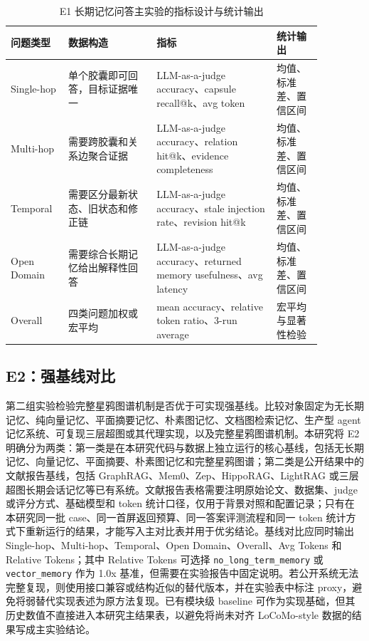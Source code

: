 \documentclass[a4paper,fleqn]{cas-sc}
\begin{document}
\begin{CJK*}{UTF8}{gbsn}
\begin{table}[t]
\centering
\scriptsize
\caption{E1 长期记忆问答主实验的指标设计与统计输出}
\label{tab:e1-main-qa}
\setlength{\tabcolsep}{3pt}
\begin{tabular}{P{0.15\linewidth}P{0.25\linewidth}P{0.34\linewidth}P{0.13\linewidth}}
\toprule
问题类型 & 数据构造 & 指标 & 统计输出 \\
\midrule
Single-hop & 单个胶囊即可回答，目标证据唯一 & LLM-as-a-judge accuracy、capsule recall@k、avg token & 均值、标准差、置信区间 \\
Multi-hop & 需要跨胶囊和关系边聚合证据 & LLM-as-a-judge accuracy、relation hit@k、evidence completeness & 均值、标准差、置信区间 \\
Temporal & 需要区分最新状态、旧状态和修正链 & LLM-as-a-judge accuracy、stale injection rate、revision hit@k & 均值、标准差、置信区间 \\
Open Domain & 需要综合长期记忆给出解释性回答 & LLM-as-a-judge accuracy、returned memory usefulness、avg latency & 均值、标准差、置信区间 \\
Overall & 四类问题加权或宏平均 & mean accuracy、relative token ratio、3-run average & 宏平均与显著性检验 \\
\bottomrule
\end{tabular}
\end{table}

\subsection{E2：强基线对比}

第二组实验检验完整星鸦图谱机制是否优于可实现强基线。比较对象固定为无长期记忆、纯向量记忆、平面摘要记忆、朴素图记忆、文档图检索记忆、生产型 agent 记忆系统、可复现三层超图或其代理实现，以及完整星鸦图谱机制。本研究将 E2 明确分为两类：第一类是在本研究代码与数据上独立运行的核心基线，包括无长期记忆、向量记忆、平面摘要、朴素图记忆和完整星鸦图谱；第二类是公开结果中的文献报告基线，包括 GraphRAG、Mem0、Zep、HippoRAG、LightRAG 或三层超图长期会话记忆等已有系统。文献报告表格需要注明原始论文、数据集、judge 或评分方式、基础模型和 token 统计口径，仅用于背景对照和配置记录；只有在本研究同一批 case、同一首屏返回预算、同一答案评测流程和同一 token 统计方式下重新运行的结果，才能写入主对比表并用于优劣结论。基线对比应同时输出 Single-hop、Multi-hop、Temporal、Open Domain、Overall、Avg Tokens 和 Relative Tokens；其中 Relative Tokens 可选择 \texttt{no\_long\_term\_memory} 或 \texttt{vector\_memory} 作为 1.0x 基准，但需要在实验报告中固定说明。若公开系统无法完整复现，则使用接口兼容或结构近似的替代版本，并在实验表中标注 proxy，避免将弱替代实现表述为原方法复现。已有模块级 baseline 可作为实现基础，但其历史数值不直接进入本研究主结果表，以避免将尚未对齐 LoCoMo-style 数据的结果写成主实验结论。


\end{CJK*}
\end{document}
